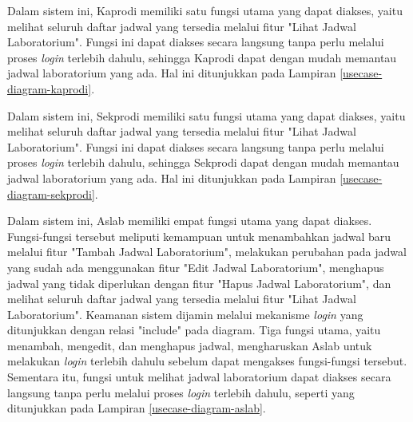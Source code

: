 Dalam sistem ini, Kaprodi memiliki satu fungsi utama yang dapat diakses, yaitu melihat seluruh daftar jadwal yang tersedia melalui fitur "Lihat Jadwal Laboratorium". Fungsi ini dapat diakses secara langsung tanpa perlu melalui proses \textit{login} terlebih dahulu, sehingga Kaprodi dapat dengan mudah memantau jadwal laboratorium yang ada. Hal ini ditunjukkan pada Lampiran \ref{usecase-diagram-kaprodi}.

Dalam sistem ini, Sekprodi memiliki satu fungsi utama yang dapat diakses, yaitu melihat seluruh daftar jadwal yang tersedia melalui fitur "Lihat Jadwal Laboratorium". Fungsi ini dapat diakses secara langsung tanpa perlu melalui proses \textit{login} terlebih dahulu, sehingga Sekprodi dapat dengan mudah memantau jadwal laboratorium yang ada. Hal ini ditunjukkan pada Lampiran \ref{usecase-diagram-sekprodi}.

Dalam sistem ini, Aslab memiliki empat fungsi utama yang dapat diakses. Fungsi-fungsi tersebut meliputi kemampuan untuk menambahkan jadwal baru melalui fitur "Tambah Jadwal Laboratorium", melakukan perubahan pada jadwal yang sudah ada menggunakan fitur "Edit Jadwal Laboratorium", menghapus jadwal yang tidak diperlukan dengan fitur "Hapus Jadwal Laboratorium", dan melihat seluruh daftar jadwal yang tersedia melalui fitur "Lihat Jadwal Laboratorium". Keamanan sistem dijamin melalui mekanisme \textit{login} yang ditunjukkan dengan relasi "include" pada diagram. Tiga fungsi utama, yaitu menambah, mengedit, dan menghapus jadwal, mengharuskan Aslab untuk melakukan \textit{login} terlebih dahulu sebelum dapat mengakses fungsi-fungsi tersebut. Sementara itu, fungsi untuk melihat jadwal laboratorium dapat diakses secara langsung tanpa perlu melalui proses \textit{login} terlebih dahulu, seperti yang ditunjukkan pada Lampiran \ref{usecase-diagram-aslab}.


